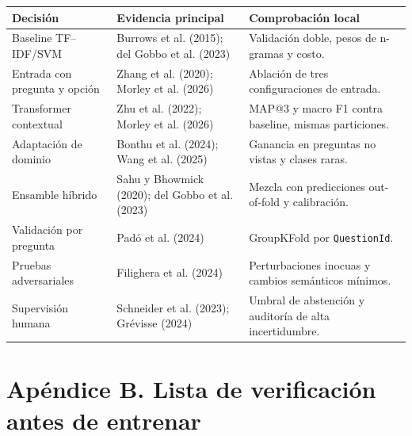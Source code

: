 \documentclass[11pt,oneside,openany]{book}
\newcommand{\codigo}[1]{\texttt{#1}}
\begin{document}
\begin{tabularx}{\textwidth}{@{}P{4.0cm}YY@{}}
\toprule
\textbf{Decisión} & \textbf{Evidencia principal} & \textbf{Comprobación local}\\
\midrule
Baseline TF--IDF/SVM & Burrows et al. (2015); del Gobbo et al. (2023) & Validación
doble, pesos de n-gramas y costo.\\
Entrada con pregunta y opción & Zhang et al. (2020); Morley et al. (2026) &
Ablación de tres configuraciones de entrada.\\
Transformer contextual & Zhu et al. (2022); Morley et al. (2026) & MAP@3 y macro F1
contra baseline, mismas particiones.\\
Adaptación de dominio & Bonthu et al. (2024); Wang et al. (2025) & Ganancia en
preguntas no vistas y clases raras.\\
Ensamble híbrido & Sahu y Bhowmick (2020); del Gobbo et al. (2023) & Mezcla con
predicciones out-of-fold y calibración.\\
Validación por pregunta & Padó et al. (2024) & GroupKFold por \codigo{QuestionId}.\\
Pruebas adversariales & Filighera et al. (2024) & Perturbaciones inocuas y cambios
semánticos mínimos.\\
Supervisión humana & Schneider et al. (2023); Grévisse (2024) & Umbral de abstención
y auditoría de alta incertidumbre.\\
\bottomrule
\end{tabularx}

\chapter*{Apéndice B. Lista de verificación antes de entrenar}
\end{document}
